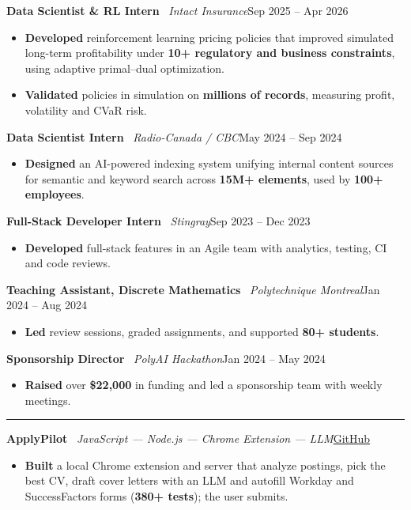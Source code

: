 \documentclass[a4paper,10pt]{article}
\newcommand{\sep}{\textbar\ }
\newcommand{\cvsection}[1]{\vspace{0.55em}\noindent{\textbf{\MakeUppercase{#1}}}\par\vspace{-0.4em}\noindent\rule{\linewidth}{0.4pt}\par\vspace{0.25em}}
\newcommand{\cvrow}[2]{\noindent #1\hfill #2\par}
\newenvironment{cvlist}{\begin{itemize}[leftmargin=1.1em,itemsep=0pt,topsep=1pt,parsep=0pt,partopsep=0pt,label=\textbullet]}{\end{itemize}\vspace{0.3em}}
\begin{document}
\cvrow{\textbf{Data Scientist \& RL Intern} \sep \textit{Intact Insurance}}{Sep 2025 -- Apr 2026}
\begin{cvlist}
  \item \textbf{Developed} reinforcement learning pricing policies that improved simulated long-term profitability under \textbf{10+ regulatory and business constraints}, using adaptive primal--dual optimization.
  \item \textbf{Validated} policies in simulation on \textbf{millions of records}, measuring profit, volatility and CVaR risk.
\end{cvlist}

\cvrow{\textbf{Data Scientist Intern} \sep \textit{Radio-Canada / CBC}}{May 2024 -- Sep 2024}
\begin{cvlist}
  \item \textbf{Designed} an AI-powered indexing system unifying internal content sources for semantic and keyword search across \textbf{15M+ elements}, used by \textbf{100+ employees}.
\end{cvlist}

\cvrow{\textbf{Full-Stack Developer Intern} \sep \textit{Stingray}}{Sep 2023 -- Dec 2023}
\begin{cvlist}
  \item \textbf{Developed} full-stack features in an Agile team with analytics, testing, CI and code reviews.
\end{cvlist}

\cvrow{\textbf{Teaching Assistant, Discrete Mathematics} \sep \textit{Polytechnique Montreal}}{Jan 2024 -- Aug 2024}
\begin{cvlist}
  \item \textbf{Led} review sessions, graded assignments, and supported \textbf{80+ students}.
\end{cvlist}

\cvrow{\textbf{Sponsorship Director} \sep \textit{PolyAI Hackathon}}{Jan 2024 -- May 2024}
\begin{cvlist}
  \item \textbf{Raised} over \textbf{\$22,000} in funding and led a sponsorship team with weekly meetings.
\end{cvlist}

\cvsection{Projects}
\cvrow{\textbf{ApplyPilot} \sep \textit{JavaScript --- Node.js --- Chrome Extension --- LLM}}{\href{https://github.com/Mbaka11/ApplyPilot}{GitHub}}
\begin{cvlist}
  \item \textbf{Built} a local Chrome extension and server that analyze postings, pick the best CV, draft cover letters with an LLM and autofill Workday and SuccessFactors forms (\textbf{380+ tests}); the user submits.
\end{cvlist}
\end{document}
